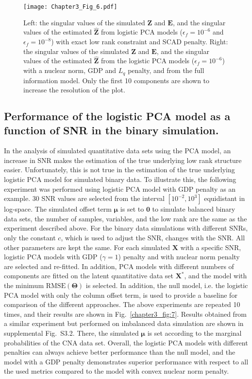 \begin{figure}[htbp]
    \centering
    \texttt{[image: Chapter3\_Fig\_6.pdf]}
    \caption{Left: the singular values of the simulated $\mathbf{Z}$ and $\mathbf{E}$, and the singular values of the estimated $\hat{\mathbf{Z}}$ from logistic PCA models ($\epsilon_f = 10^{-6}$ and $\epsilon_f = 10^{-8}$) with exact low rank constraint and SCAD penalty. Right: the singular values of the simulated $\mathbf{Z}$ and $\mathbf{E}$, and the singular values of the estimated $\hat{\mathbf{Z}}$ from the logistic PCA models ($\epsilon_f = 10^{-6}$) with a nuclear norm, GDP and $L_{q}$ penalty, and from the full information model. Only the first 10 components are shown to increase the resolution of the plot.}
    \label{chapter3_fig:6}
\end{figure}

\subsection{Performance of the logistic PCA model as a function of SNR in the binary simulation.}
In the analysis of simulated quantitative data sets using the PCA model, an increase in SNR makes the estimation of the true underlying low rank structure easier. Unfortunately, this is not true in the estimation of the true underlying logistic PCA model for simulated binary data. To illustrate this, the following experiment was performed using logistic PCA model with GDP penalty as an example. 30 SNR values are selected from the interval $[10^{-2}, 10^{3}]$ equidistant in log-space. The simulated offset term $\bm{\mu}$ is set to $\mathbf{0}$ to simulate balanced binary data sets, the number of samples, variables, and the low rank are the same as the experiment described above. For the binary data simulations with different SNRs, only the constant $c$, which is used to adjust the SNR, changes with the SNR. All other parameters are kept the same. For each simulated $\mathbf{X}$ with a specific SNR, logistic PCA models with GDP ($\gamma=1$) penalty and with nuclear norm penalty are selected and re-fitted. In addition, PCA models with different numbers of components are fitted on the latent quantitative data set $\mathbf{X}^{\ast}$, and the model with the minimum $\text{RMSE}(\mathbf{\Theta})$ is selected. In addition, the null model, i.e. the logistic PCA model with only the column offset term, is used to provide a baseline for comparison of the different approaches. The above experiments are repeated 10 times, and their results are shown in Fig.~\ref{chapter3_fig:7}. Results obtained from a similar experiment but performed on imbalanced data simulation are shown in supplemental Fig.~S3.2. There, the simulated $\bm{\mu}$ is set according to the marginal probabilities of the CNA data set. Overall, the logistic PCA models with different penalties can always achieve better performance than the null model, and the model with a GDP penalty demonstrates superior performance with respect to all the used metrics compared to the model with convex nuclear norm penalty.

